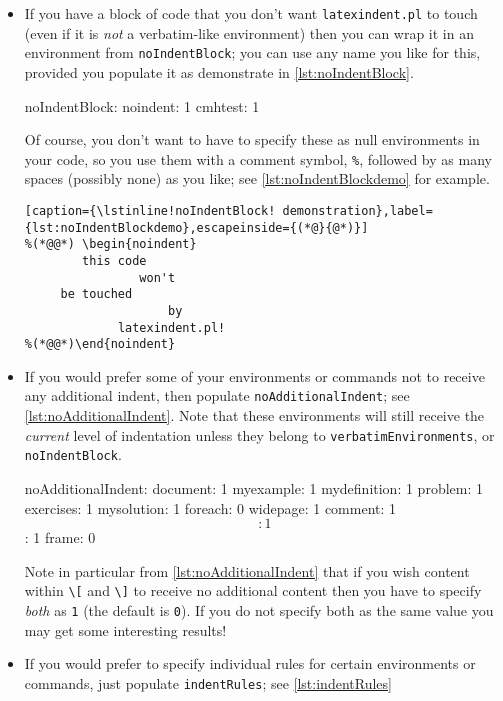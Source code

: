 \begin{itemize}
	\item[\verbitem{noIndentBlock}] If you have a block of code that you don't 
	want \lstinline!latexindent.pl! to touch (even if it is \emph{not} a verbatim-like
	environment) then you can wrap it in an environment from \lstinline!noIndentBlock!;
	you can use any name you like for this, provided you populate it as demonstrate in 
	\cref{lst:noIndentBlock}.
													 		 		 		 		 					
	\begin{yaml}[caption={\lstinline!noIndentBlock!},label={lst:noIndentBlock}]
noIndentBlock:
    noindent: 1
    cmhtest: 1
	\end{yaml}
													 		 		 		 		 					
	Of course, you don't want to have to specify these as null environments
	in your code, so you use them with a comment symbol, \lstinline!%!, followed 
	by as many spaces (possibly none) as you like; see \cref{lst:noIndentBlockdemo} for 
	example.
	\begin{lstlisting}[caption={\lstinline!noIndentBlock! demonstration},label={lst:noIndentBlockdemo},escapeinside={(*@}{@*)}]
%(*@@*) \begin{noindent} 
        this code
                won't 
     be touched
                    by 
             latexindent.pl!
%(*@@*)\end{noindent} 
	\end{lstlisting}
													 		 		 		 		 					
	\item[\verbitem{noAdditionalIndent}] If you would prefer some of your
	environments or commands not to receive any additional indent, then 
	populate \lstinline!noAdditionalIndent!; see \cref{lst:noAdditionalIndent}. 
	Note that these environments will still receive the \emph{current} level
	of indentation unless they belong to \lstinline!verbatimEnvironments!, or \lstinline!noIndentBlock!.
													 		 		 		 		 					
	\begin{yaml}[caption={\lstinline!noAdditionalIndent!},label={lst:noAdditionalIndent}]
noAdditionalIndent:
    document: 1
    myexample: 1
    mydefinition: 1
    problem: 1
    exercises: 1
    mysolution: 1
    foreach: 0
    widepage: 1
    comment: 1
    \[: 1
    \]: 1
    frame: 0
	\end{yaml}
	Note in particular from \cref{lst:noAdditionalIndent} that if you wish content within 
	\lstinline!\[!  and \lstinline!\]! to receive no additional content then 
	you have to specify \emph{both} as \lstinline!1! (the default is \lstinline!0!). 
	If you do not specify both as the same value you may get some interesting results!
	\item[\verbitem{indentRules}] If\label{page:indentRules} you would prefer to specify 
	individual rules for certain environments or commands, just
	populate \lstinline!indentRules!; see \cref{lst:indentRules}
													 		 		 		 		 					

\end{itemize}
